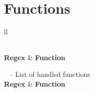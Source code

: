 \section{Functions}
\begin{longtable}{ll}
    \caption[List of handled functions]{List of handled functions}\\
    \textbf{Regex} & \textbf{Function} \\ 
    \endfirsthead

    {{\tablename\ \thetable{} -- List of handled functions}} \\
    \textbf{Regex} & \textbf{Function} \\ 
    \endhead

     \\ \endfoot


\end{longtable}
